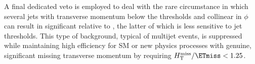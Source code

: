

A final dedicated veto is employed to deal with the rare circumstance
in which several jets with transverse momentum below the \Pt
thresholds and collinear in $\phi$ can result in significant \mht
relative to \ETmiss, the latter of which is less sensitive to jet
thresholds. This type of background, typical of multijet events, is
suppressed while maintaining high efficiency for SM or new physics
processes with genuine, significant missing transverse momentum by
requiring $\mht / \ETmiss < 1.25$. 

